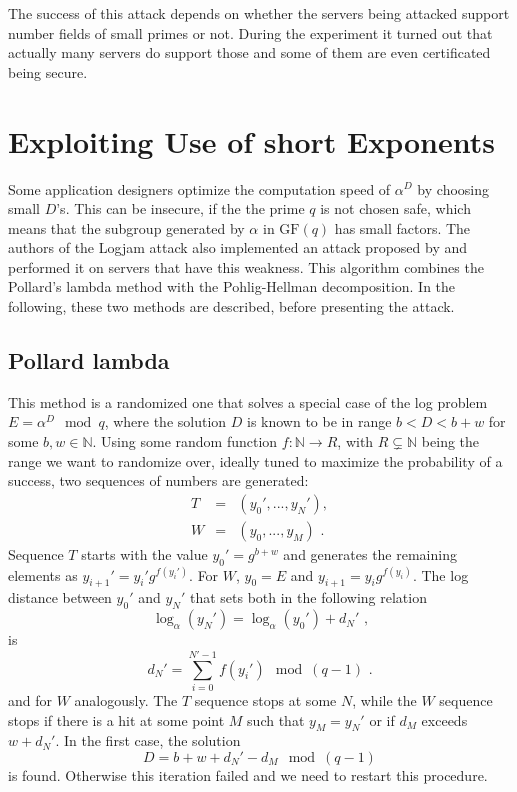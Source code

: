 \documentclass[paper=a4, fontsize=11pt]{scrartcl} %
\numberwithin{equation}{section} %
\numberwithin{figure}{section} %
\numberwithin{table}{section} %
\begin{document}
The success of this attack depends on whether the servers being attacked support number fields of small primes or not. During the experiment it turned out that actually many servers do support those and some of them are even certificated being secure.

\section{Exploiting Use of short Exponents}
Some application designers optimize the computation speed of $\alpha^D$ by choosing small $D$'s. This can be insecure, if the the prime $q$ is not chosen safe, which means that the subgroup generated by $\alpha$ in $\mathrm{GF}(q)$ has small factors. The authors of the Logjam attack also implemented an attack proposed by \citep{van1996diffie} and performed it on servers that have this weakness. This algorithm combines the Pollard's lambda method with the Pohlig-Hellman decomposition. In the following, these two methods are described, before presenting the attack.

\subsection{Pollard lambda} This method is a randomized one that solves a special case of the log problem $E = \alpha^D\mod q$, where the solution $D$ is known to be in range $b<D<b+w$ for some $b,w\in \mathbb{N}$. Using some random function $f:\mathbb{N}\rightarrow R$, with $R\subsetneq\mathbb{N}$ being the range we want to randomize over, ideally tuned to maximize the probability of a success, two sequences of numbers are generated:
\begin{equation}
\begin{array}{lcl}
T & = & (y_0',...,y_N'),\\
W & = & (y_0,...,y_M)
\text{ .}
\end{array}
\end{equation}
Sequence $T$ starts with the value $y_0' = g^{b+w}$ and generates the remaining elements as $y_{i+1}' = y_i'g^{f(y_i')}$. For $W$, $y_0 = E$ and $y_{i+1} = y_ig^{f(y_i)}$. The log distance between $y_0'$ and $y_N'$ that sets both in the following relation
\begin{equation}
\log_\alpha(y_N') = \log_\alpha(y_0') + d_N'
\text{ ,}
\end{equation}
is
\begin{equation}
d_N' = \sum_{i=0}^{N'-1}f(y_i')\mod (q-1)
\text{ .}
\end{equation}
and for $W$ analogously. The $T$ sequence stops at some $N$, while the $W$ sequence stops if there is a hit at some point $M$ such that $y_M = y_N'$ or if $d_M$ exceeds $w+d_N'$. In the first case, the solution
\begin{equation}
D = b + w + d_N' - d_M \mod (q-1)
\end{equation}
is found. Otherwise this iteration failed and we need to restart this procedure.
\end{document}
